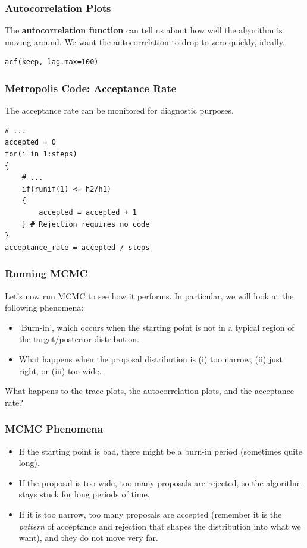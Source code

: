 \documentclass{beamer}
\begin{document}
\begin{frame}[fragile]
\frametitle{Autocorrelation Plots}
The {\bf autocorrelation function} can tell us about how well the algorithm
is moving around. We want the autocorrelation to drop to zero quickly, ideally.

\begin{verbatim}
acf(keep, lag.max=100)
\end{verbatim}

\end{frame}




\begin{frame}[fragile]
\frametitle{Metropolis Code: Acceptance Rate}
The acceptance rate can be monitored for diagnostic purposes.
\small
\begin{verbatim}
# ...
accepted = 0
for(i in 1:steps)
{
    # ...
    if(runif(1) <= h2/h1)
    {
        accepted = accepted + 1
    } # Rejection requires no code
}
acceptance_rate = accepted / steps
\end{verbatim}

\end{frame}




\begin{frame}
\frametitle{Running MCMC}
Let's now run MCMC to see how it performs. In particular, we will look at
the following phenomena:
\begin{itemize}
\item `Burn-in', which occurs when the starting point is not in a typical region
of the target/posterior distribution.\pause
\item What happens when the proposal distribution is (i) too narrow,
(ii) just right, or (iii) too wide.
\end{itemize}
\pause
What happens to the trace plots, the autocorrelation plots, and the acceptance
rate?

\end{frame}



\begin{frame}
\frametitle{MCMC Phenomena}
\begin{itemize}
\item If the starting point is bad, there might be a burn-in period (sometimes
quite long). \pause
\item If the proposal is too wide, too many proposals are rejected, so the
algorithm stays stuck for long periods of time.\pause
\item If it is too narrow, too many proposals are accepted (remember it is
the {\em pattern} of acceptance and rejection that shapes the distribution
into what we want), and they do not move very far.
\end{itemize}

\end{frame}
\end{document}
